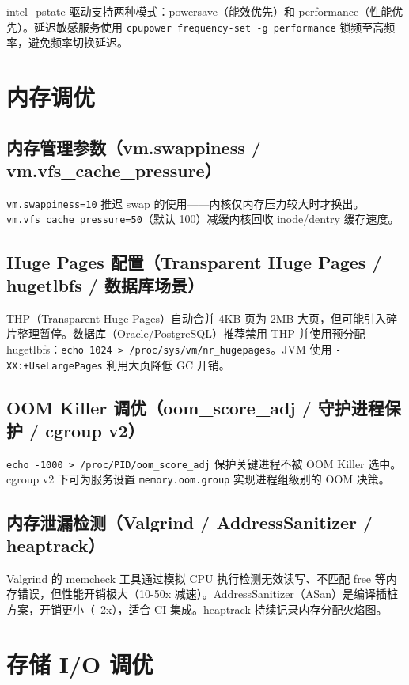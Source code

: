 \documentclass[12pt,UTF8]{ctexbook}
\begin{document}
intel\_pstate 驱动支持两种模式：powersave（能效优先）和 performance（性能优先）。延迟敏感服务使用 \verb|cpupower frequency-set -g performance| 锁频至高频率，避免频率切换延迟。

  \section{内存调优}
    \subsection{内存管理参数（vm.swappiness / vm.vfs\_cache\_pressure）}

\verb|vm.swappiness=10| 推迟 swap 的使用——内核仅内存压力较大时才换出。\verb|vm.vfs_cache_pressure=50|（默认 100）减缓内核回收 inode/dentry 缓存速度。

    \subsection{Huge Pages 配置（Transparent Huge Pages / hugetlbfs / 数据库场景）}

THP（Transparent Huge Pages）自动合并 4KB 页为 2MB 大页，但可能引入碎片整理暂停。数据库（Oracle/PostgreSQL）推荐禁用 THP 并使用预分配 hugetlbfs：\verb|echo 1024 > /proc/sys/vm/nr_hugepages|。JVM 使用 \verb|-XX:+UseLargePages| 利用大页降低 GC 开销。

    \subsection{OOM Killer 调优（oom\_score\_adj / 守护进程保护 / cgroup v2）}

\verb|echo -1000 > /proc/PID/oom_score_adj| 保护关键进程不被 OOM Killer 选中。cgroup v2 下可为服务设置 \verb|memory.oom.group| 实现进程组级别的 OOM 决策。

    \subsection{内存泄漏检测（Valgrind / AddressSanitizer / heaptrack）}

Valgrind 的 memcheck 工具通过模拟 CPU 执行检测无效读写、不匹配 free 等内存错误，但性能开销极大（10-50x 减速）。AddressSanitizer（ASan）是编译插桩方案，开销更小（~2x），适合 CI 集成。heaptrack 持续记录内存分配火焰图。

  \section{存储 I/O 调优}
\end{document}
